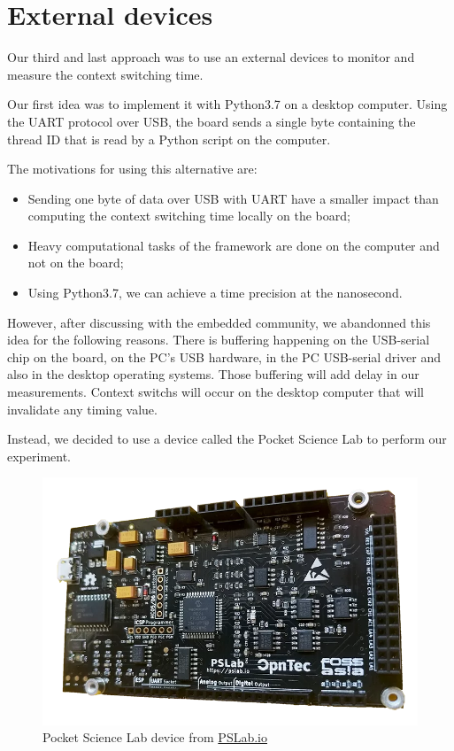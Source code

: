 \section{External devices}

Our third and last approach was to use an external devices to monitor and measure the context switching time.

Our first idea was to implement it with Python3.7 on a desktop computer.
Using the UART protocol over USB, the board sends a single byte containing the thread ID that is read by a Python script on the computer.

The motivations for using this alternative are:
\begin{itemize}
  \item Sending one byte of data over USB with UART have a smaller impact than computing the context switching time locally on the board;
  \item Heavy computational tasks of the framework are done on the computer and not on the board;
  \item Using Python3.7, we can achieve a time precision at the nanosecond.
\end{itemize}

However, after discussing with the embedded community, we abandonned this idea for the following reasons.
There is buffering happening on the USB-serial chip on the board, on the PC's USB hardware, in the PC USB-serial driver and also in the desktop operating systems.
Those buffering will add delay in our measurements.
Context switchs will occur on the desktop computer that will invalidate any timing value.

Instead, we decided to use a device called the Pocket Science Lab to perform our experiment.

\begin{figure}[!ht]
  \centering
  \includegraphics[scale=0.25]{assets/pslab.png}
  \caption{\label{fig:pslab}Pocket Science Lab device from \href{https://pslab.io}{PSLab.io}}
\end{figure}

